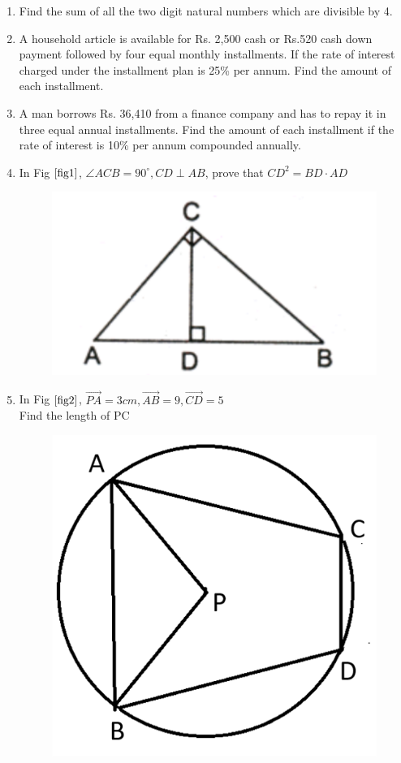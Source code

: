 \documentclass[journal,12pt,twocolumn]{IEEEtran}
\renewcommand\thesection{\arabic{section}}
\begin{document}
\begin{enumerate}[label=\thesection.\arabic*.,ref=\thesection.\theenumi]
\item Find the sum of all the two digit natural numbers which are divisible by 4.\\
\item A household article is available for Rs. 2,500 cash or Rs.520 cash down payment followed by four equal monthly installments.
If the rate of interest charged under the installment plan is 25\% per annum. Find the amount of each installment.\\
\item A man borrows Rs. 36,410 from a finance company and has to repay it in three equal annual installments. Find the amount of each
installment if the rate of interest is 10\% per annum compounded annually.\\
\item In Fig $\ref{fig1}$, $\angle{ACB} = 90^\circ , CD \perp AB $, prove that $CD^2 = BD \cdot AD $\\
\begin{figure}[h!]
    \centering
    \includegraphics[width=0.5\columnwidth,center]{fig 1.1.png}
	\caption{}
	\label{fig1}
 \end{figure}
\vspace{2mm}
\item In Fig $\ref{fig2}$, $\vec{PA} = 3cm, \vec{AB} = 9, \vec{CD} = 5$\\
Find the length of PC\\
\begin{figure}[h!]
    \centering
    \includegraphics[width=0.5\columnwidth,center]{fig 1.2.png}
	\caption{}
	\label{fig2}
 \end{figure}
\end{enumerate}
\end{document}
